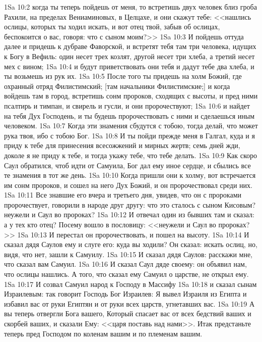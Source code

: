 \vs 1Sa 10:2 когда ты теперь пойдешь от меня, то встретишь двух человек близ гроба Рахили, на пределах Вениаминовых, в Целцахе, и они скажут тебе: <<нашлись ослицы, которых ты ходил искать, и вот отец твой, забыв об ослицах, беспокоится о вас, говоря: что с сыном моим?>>
\vs 1Sa 10:3 И пойдешь оттуда далее и придешь к дубраве Фаворской, и встретят тебя там три человека, идущих к Богу в Вефиль: один несет трех козлят, другой несет три хлеба, а третий несет мех с вином;
\vs 1Sa 10:4 и будут приветствовать они тебя и дадут тебе два хлеба, и ты возьмешь из рук их.
\vs 1Sa 10:5 После того ты придешь на холм Божий, где охранный отряд Филистимский; [там начальники Филистимские;] и когда войдешь там в город, встретишь сонм пророков, сходящих с высоты, и пред ними псалтирь и тимпан, и свирель и гусли, и они пророчествуют;
\vs 1Sa 10:6 и найдет на тебя Дух Господень, и ты будешь пророчествовать с ними и сделаешься иным человеком.
\vs 1Sa 10:7 Когда эти знамения сбудутся с тобою, тогда делай, что может рука твоя, ибо с тобою Бог.
\vs 1Sa 10:8 И ты пойди прежде меня в Галгал, куда и я приду к тебе для принесения всесожжений и мирных жертв; семь дней жди, доколе я не приду к тебе, и тогда укажу тебе, что тебе делать.
\vs 1Sa 10:9 Как скоро Саул обратился, чтоб идти от Самуила, Бог дал ему иное сердце, и сбылись все те знамения в тот же день.
\vs 1Sa 10:10 Когда пришли они к холму, вот встречается им сонм пророков, и сошел на него Дух Божий, и он пророчествовал среди них.
\vs 1Sa 10:11 Все знавшие его вчера и третьего дня, увидев, что он с пророками пророчествует, говорили в народе друг другу: что это сталось с сыном Кисовым? неужели и Саул во пророках?
\vs 1Sa 10:12 И отвечал один из бывших там и сказал: а у тех кто отец? Посему вошло в пословицу: <<неужели и Саул во пророках?>>
\vs 1Sa 10:13 И перестал он пророчествовать, и пошел на высоту.
\vs 1Sa 10:14 И сказал дядя Саулов ему и слуге его: куда вы ходили? Он сказал: искать ослиц, но, видя, что  нет, зашли к Самуилу.
\vs 1Sa 10:15 И сказал дядя Саулов: расскажи мне, что сказал вам Самуил.
\vs 1Sa 10:16 И сказал Саул дяде своему: он объявил нам, что ослицы нашлись. А того, что сказал ему Самуил о царстве, не открыл ему.
\rsbpar\vs 1Sa 10:17 И созвал Самуил народ к Господу в Массифу
\vs 1Sa 10:18 и сказал сынам Израилевым: так говорит Господь Бог Израилев: Я вывел Израиля из Египта и избавил вас от руки Египтян и от руки всех царств, угнетавших вас.
\vs 1Sa 10:19 А вы теперь отвергли Бога вашего, Который спасает вас от всех бедствий ваших и скорбей ваших, и сказали Ему: <<царя поставь над нами>>. Итак предстаньте теперь пред Господом по коленам вашим и по племенам вашим.
